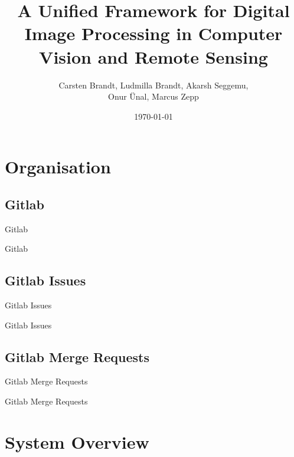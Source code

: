 \documentclass{beamer}
\title{A Unified Framework for Digital Image Processing in Computer Vision and Remote Sensing}
\author{
Carsten Brandt,
Ludmilla Brandt,
Akarsh Seggemu,\\
Onur Ünal,
Marcus Zepp
}
\date{\today}
\begin{document}
\begin{frame}
	\titlepage
\end{frame}

\begin{frame}
	\tableofcontents  \pnote{}
\end{frame}


\section{Organisation}
\subsection{Gitlab}
\begin{frame}{Gitlab}

	Gitlab

\end{frame}

\subsection{Gitlab Issues}
\begin{frame}{Gitlab Issues}

	Gitlab Issues

\end{frame}

\subsection{Gitlab Merge Requests}
\begin{frame}{Gitlab Merge Requests}

	Gitlab Merge Requests

\end{frame}


\section{System Overview}
\end{document}
